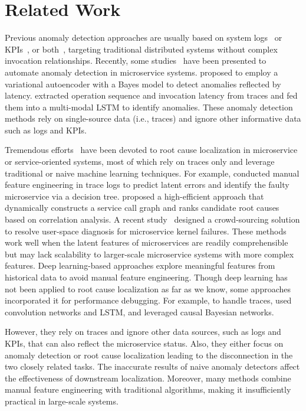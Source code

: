 \section{Related Work}\label{sec:relatedwork}
Previous anomaly detection approaches are usually based on system logs~\cite{Deeplog, LogAnomaly, LogRobust, SwissLog, BertLog} or KPIs~\cite{Adsketch, SRCNN, InterFusion, USAD, OmniAnomaly}, or both~\cite{Hades}, targeting traditional distributed systems without complex invocation relationships.
Recently, some studies~\cite{TraceAnomaly, MMTrace, AID} have been presented to automate anomaly detection in microservice systems. 
\cite{TraceAnomaly} proposed to employ a variational autoencoder with a Bayes model to detect anomalies reflected by latency.
\cite{MMTrace} extracted operation sequence and invocation latency from traces and fed them into a multi-modal LSTM to identify anomalies.
These anomaly detection methods rely on single-source data (i.e., traces) and ignore other informative data such as logs and KPIs.

Tremendous efforts~\cite{TBAC, NetMedic, MonitorRank, CloudRanger, MicroCause, AutoMAP, TraceRCA} have been devoted to root cause localization in microservice or service-oriented systems, most of which rely on traces only and leverage traditional or naive machine learning techniques.
For example, \cite{MEPFL} conducted manual feature engineering in trace logs to predict latent errors and identify the faulty microservice via a decision tree. 
\cite{MicroHECL} proposed a high-efficient approach that dynamically constructs a service call graph and ranks candidate root causes based on correlation analysis. 
A recent study~\cite{DyCause} designed a crowd-sourcing solution to resolve user-space diagnosis for microservice kernel failures. 
These methods work well when the latent features of microservices are readily comprehensible but may lack scalability to larger-scale microservice systems with more complex features.
Deep learning-based approaches explore meaningful features from historical data to avoid manual feature engineering. Though deep learning has not been applied to root cause localization as far as we know, some approaches incorporated it for performance debugging. 
For example, to handle traces, \cite{Seer} used convolution networks and LSTM, and \cite{Sage} leveraged causal Bayesian networks.

However, they rely on traces and ignore other data sources, such as logs and KPIs, that can also reflect the microservice status. 
Also, they either focus on anomaly detection or root cause localization leading to the disconnection in the two closely related tasks. The inaccurate results of naive anomaly detectors affect the effectiveness of downstream localization.
Moreover, many methods combine manual feature engineering with traditional algorithms, making it insufficiently practical in large-scale systems.